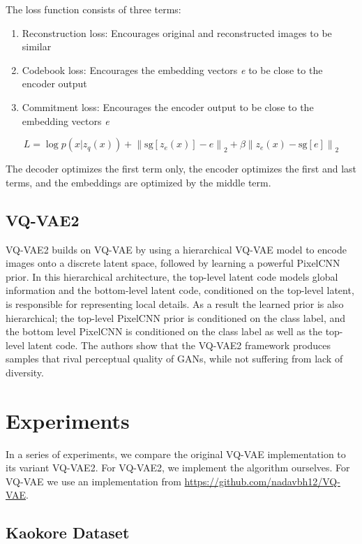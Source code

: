 \documentclass{article}
\begin{document}
The loss function consists of three terms: 
\begin{enumerate}
\item Reconstruction loss: Encourages original and reconstructed images to be similar
\item Codebook loss: Encourages the embedding vectors \textit{e} to be close to the encoder output 
\item Commitment loss: Encourages the encoder output to be close to the embedding vectors \textit{e} 
\end{enumerate}

\begin{equation}
L = \log{p(x|z_q(x))} + {\|\textrm{sg}[z_e(x)]-e\|}_2 + \beta{\|z_e(x)-\textrm{sg}[e]\|}_2
\end{equation}


The decoder optimizes the first term only, the encoder optimizes the first and last terms, and the embeddings are optimized by the middle term. 

\subsection{VQ-VAE2}

VQ-VAE2 builds on VQ-VAE by using a hierarchical VQ-VAE model to encode images onto a discrete latent space, followed by learning a powerful PixelCNN prior. In this hierarchical architecture, the top-level latent code models global information and the bottom-level latent code, conditioned on the top-level latent, is responsible for representing local details. As a result the learned prior is also hierarchical; the top-level PixelCNN prior is conditioned on the class label, and the bottom level PixelCNN is conditioned on the class label as well as the top-level latent code. The authors show that the VQ-VAE2 framework produces samples that rival perceptual quality of GANs, while not suffering from lack of diversity. 

\section{Experiments}

In a series of experiments, we compare the original VQ-VAE implementation to its variant VQ-VAE2. For VQ-VAE2, we implement the algorithm ourselves. For VQ-VAE we use an implementation from \url{https://github.com/nadavbh12/VQ-VAE}.

\subsection{Kaokore Dataset}
\end{document}
